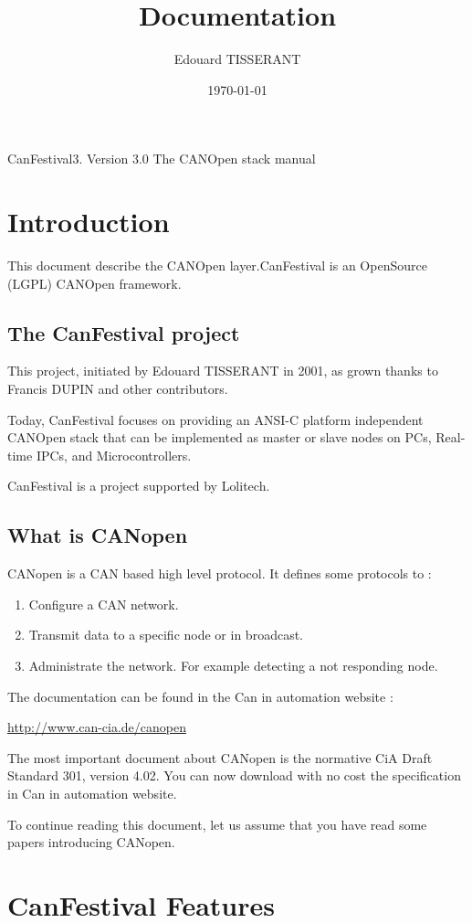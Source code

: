 \documentclass[12pt,twoside]{article}
\title{\Huge Documentation}
\author{Edouard TISSERANT}
\date{\today}
\newcommand\liststyleLi{%
\renewcommand\labelitemi{{--}}
\renewcommand\labelitemii{{--}}
\renewcommand\labelitemiii{{--}}
\renewcommand\labelitemiv{{--}}
}
\begin{document}
{\centering\sffamily
CanFestival3. Version 3.0\newline
The CANOpen stack manual
\par}

\setcounter{tocdepth}{2}
\renewcommand\contentsname{Table of contents}
\tableofcontents
\section{Introduction}
This document describe the CANOpen layer.CanFestival is an OpenSource
(LGPL) CANOpen framework.

\subsection{The CanFestival project}
This project, initiated by Edouard TISSERANT in 2001, as grown thanks to
Francis DUPIN and other contributors.

Today, CanFestival focuses on providing an ANSI{}-C platform independent
CANOpen stack that can be implemented as master or slave nodes on PCs,
Real{}-time IPCs, and Microcontrollers.

CanFestival is a project supported by Lolitech.

\subsection{What is CANopen}
CANopen is a CAN based high level protocol. It defines some protocols to
:

\liststyleLi
\begin{enumerate}
\item Configure a CAN network.
\item Transmit data to a specific node or in broadcast.
\item Administrate the network. For example detecting a not responding
node.
\end{enumerate}
The documentation can be found in the Can in automation website :

\href{http://www.can-cia.de/canopen}{http://www.can{}-cia.de/canopen}

The most important document about CANopen is the normative CiA Draft
Standard 301, version 4.02. You can now download with no cost the
specification in Can in automation website.

To continue reading this document, let us assume that you have read some
papers introducing CANopen.

\section{CanFestival Features}
\end{document}
